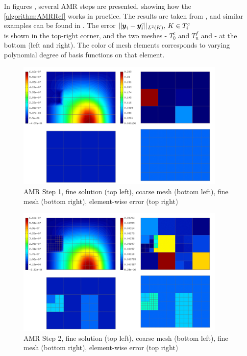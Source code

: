 In figures , several AMR steps are presented, showing how the \cref{algorithm:AMRRef} works in practice. The results are taken from \cite{ja1}, and similar examples can be found in \cite{ja2}. The error $||\mbox{\boldmath $y$}_i - \mbox{\boldmath $y$}_i^c||_{L^2\left( K\right)},\, K \in T_i^c$\\ is shown in the top-right corner, and the two meshes - $T_0^{c}$ and $T_n^{f}$ and - at the bottom (left and right). The color of mesh elements corresponds to varying polynomial degree of basis functions on that element.

\begin{figure}[H]
	\begin{center}
		\includegraphics[width=0.92\textwidth]{img/adapt/ref/1.jpg}
		\caption{AMR Step 1, fine solution (top left), coarse mesh (bottom left), fine mesh (bottom right), element-wise error (top right)}
	\label{figure:amrRef1}
	\end{center}
\end{figure}
\vspace{-4mm}
\begin{figure}[H]
	\begin{center}
		\includegraphics[width=0.92\textwidth]{img/adapt/ref/2.jpg}
		\caption{AMR Step 2, fine solution (top left), coarse mesh (bottom left), fine mesh (bottom right), element-wise error (top right)}
	\label{figure:amrRef2}
	\end{center}
\end{figure}
